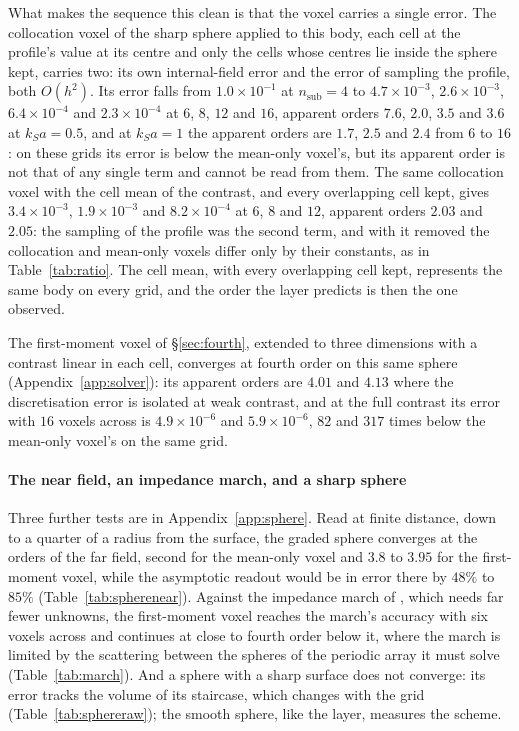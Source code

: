 \documentclass[preprint,review,12pt]{elsarticle}
\begin{document}
What makes the sequence this clean is that the voxel carries a single error. The collocation voxel
of the sharp sphere applied to this body, each cell at the profile's value at its centre and only the
cells whose centres lie inside the sphere kept, carries two: its own internal-field error and the
error of sampling the profile, both $O(h^2)$. Its error falls from $1.0\times10^{-1}$ at
$n_{\mathrm{sub}}=4$ to $4.7\times10^{-3}$, $2.6\times10^{-3}$, $6.4\times10^{-4}$ and
$2.3\times10^{-4}$ at $6$, $8$, $12$ and $16$, apparent orders $7.6$, $2.0$, $3.5$ and $3.6$ at
$k_Sa=0.5$, and at $k_Sa=1$ the apparent orders are $1.7$, $2.5$ and $2.4$ from $6$ to $16$: on
these grids its error is below the mean-only voxel's, but its apparent order is not that of any
single term and cannot be read from them. The same collocation voxel with the cell mean of the
contrast, and every overlapping cell kept, gives $3.4\times10^{-3}$, $1.9\times10^{-3}$ and
$8.2\times10^{-4}$ at $6$, $8$ and $12$, apparent orders $2.03$ and $2.05$: the sampling of the
profile was the second term, and with it removed the collocation and mean-only voxels differ only by
their constants, as in Table~\ref{tab:ratio}. The cell mean, with every
overlapping cell kept, represents the same body on every grid, and the order the layer predicts is
then the one observed.

The first-moment voxel of \S\ref{sec:fourth}, extended to three dimensions with a contrast linear in
each cell, converges at fourth order on this same sphere (Appendix~\ref{app:solver}): its apparent orders
are $4.01$ and $4.13$ where the discretisation error is isolated at weak contrast, and at the full
contrast its error with $16$ voxels across is $4.9\times10^{-6}$ and $5.9\times10^{-6}$, $82$ and
$317$ times below the mean-only voxel's on the same grid.

\paragraph{The near field, an impedance march, and a sharp sphere} Three further tests are in
Appendix~\ref{app:sphere}. Read at finite distance, down to a quarter of a radius from the surface, the
graded sphere converges at the orders of the far field, second for the mean-only voxel and $3.8$ to
$3.95$ for the first-moment voxel, while the asymptotic readout would be in error there by $48\%$ to
$85\%$ (Table~\ref{tab:spherenear}). Against the impedance march of \citet{Haines2004}, which needs
far fewer unknowns, the first-moment voxel reaches the march's accuracy with six voxels across and
continues at close to fourth order below it, where the march is limited by the scattering between
the spheres of the periodic array it must solve (Table~\ref{tab:march}). And a sphere with a sharp
surface does not converge: its error tracks the volume of its staircase, which changes with the grid
(Table~\ref{tab:sphereraw}); the smooth sphere, like the layer, measures the scheme.
\end{document}
